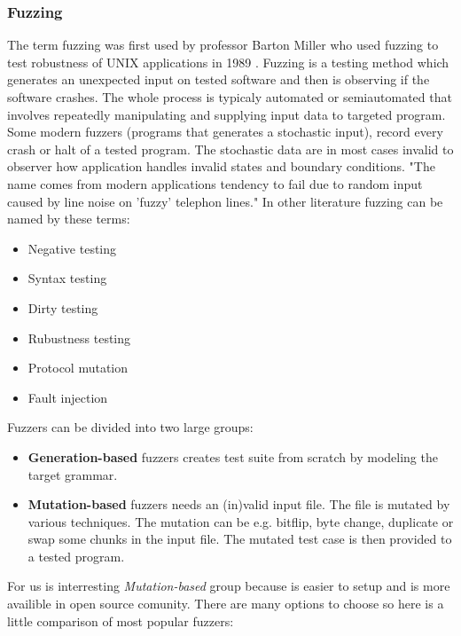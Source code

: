 \subsubsection{Fuzzing}
\label{fuzzing}
The term fuzzing was first used by professor Barton Miller who used fuzzing to test robustness of UNIX applications in 1989 \cite{Takanen:2008:FSS:1404500, Marhefka2013}.
Fuzzing is a testing method which generates an unexpected input on tested software and then is observing if the software crashes. The whole process is
typicaly automated or semiautomated that involves repeatedly manipulating and supplying input data to targeted program.
Some modern fuzzers (programs that generates a stochastic input), record every crash or halt of a tested program.
The stochastic data are in most cases invalid to observer how application handles invalid
states and boundary conditions.
"The name comes from modern applications tendency to fail due to random input caused by line noise on 'fuzzy' telephon lines."\cite{Takanen:2008:FSS:1404500, N2LYDLnqzEFYp0wM, takanen2009fuzzing}
In other literature fuzzing can be named by these terms:
\begin{itemize}
	\item Negative testing
	\item Syntax testing
	\item Dirty testing
	\item Rubustness testing
	\item Protocol mutation
	\item Fault injection
\end{itemize}

\noindent
Fuzzers can be divided into two large groups:

\begin{itemize}
	\item \textbf{Generation-based} fuzzers creates test suite from scratch by modeling the target grammar.
	\item \textbf{Mutation-based} fuzzers needs an (in)valid input file. The file is mutated by various techniques.
	The mutation can be e.g. bitflip, byte change, duplicate or swap some chunks in the input file.
	The mutated test case is then provided to a tested program.
\end{itemize}

For us is interresting \emph{Mutation-based} group because is easier to setup and
is more availible in open source comunity. There are many options to choose so here is
a little comparison of most popular fuzzers:

